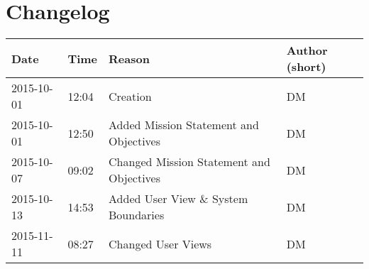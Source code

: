\chapter{Changelog}

\begin{table}[h]
	\begin{tabularx}{\textwidth}{llll}
		Date & Time & Reason & Author (short)\\
		\toprule
		2015-10-01 & 12:04 & Creation & DM\\
		2015-10-01 & 12:50 & Added Mission Statement and Objectives & DM\\
		2015-10-07 & 09:02 & Changed Mission Statement and Objectives & DM\\
		2015-10-13 & 14:53 & Added User View \& System Boundaries & DM\\
		2015-11-11 & 08:27 & Changed User Views & DM\\
	\end{tabularx}
\end{table}

